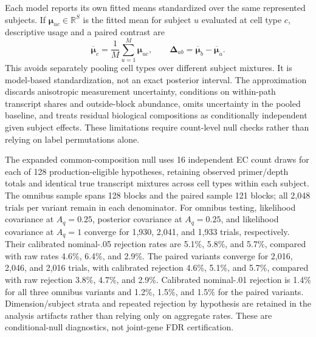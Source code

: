 \documentclass[11pt]{article}
\begin{document}
Each model reports its own fitted means standardized over the same represented subjects. If \(\boldsymbol\mu_{uc}\in\mathbb R^S\) is the fitted mean for subject \(u\) evaluated at cell type \(c\), descriptive usage and a paired contrast are \begin{equation}\overline{\boldsymbol\mu}_c=\frac1M\sum_{u=1}^M\boldsymbol\mu_{uc},\qquad \boldsymbol\Delta_{ab}=\overline{\boldsymbol\mu}_b-\overline{\boldsymbol\mu}_a.\end{equation} This avoids separately pooling cell types over different subject mixtures. It is model-based standardization, not an exact posterior interval. The approximation discards anisotropic measurement uncertainty, conditions on within-path transcript shares and outside-block abundance, omits uncertainty in the pooled baseline, and treats residual biological compositions as conditionally independent given subject effects. These limitations require count-level null checks rather than relying on label permutations alone.

The expanded common-composition null uses 16 independent EC count draws for each of 128 production-eligible hypotheses, retaining observed primer/depth totals and identical true transcript mixtures across cell types within each subject. The omnibus sample spans 128 blocks and the paired sample 121 blocks; all 2,048 trials per variant remain in each denominator. For omnibus testing, likelihood covariance at \(A_q=0.25\), posterior covariance at \(A_q=0.25\), and likelihood covariance at \(A_q=1\) converge for 1,930, 2,041, and 1,933 trials, respectively. Their calibrated nominal-.05 rejection rates are 5.1\%, 5.8\%, and 5.7\%, compared with raw rates 4.6\%, 6.4\%, and 2.9\%. The paired variants converge for 2,016, 2,046, and 2,016 trials, with calibrated rejection 4.6\%, 5.1\%, and 5.7\%, compared with raw rejection 3.8\%, 4.7\%, and 2.9\%. Calibrated nominal-.01 rejection is 1.4\% for all three omnibus variants and 1.2\%, 1.5\%, and 1.5\% for the paired variants. Dimension/subject strata and repeated rejection by hypothesis are retained in the analysis artifacts rather than relying only on aggregate rates. These are conditional-null diagnostics, not joint-gene FDR certification.
\end{document}
